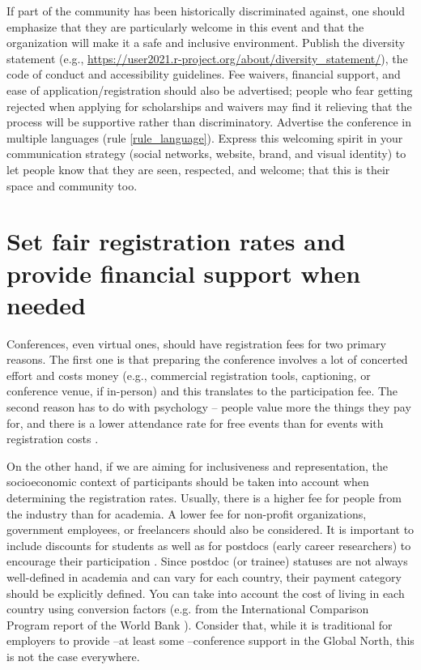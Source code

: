 \documentclass[10pt,letterpaper]{article}
\begin{document}
If part of the community has been historically discriminated against, one should emphasize that they are particularly welcome in this event and that the organization will make it a safe and inclusive environment. Publish the diversity statement (e.g., \url{https://user2021.r-project.org/about/diversity_statement/}), the code of conduct and accessibility guidelines. Fee waivers, financial support, and ease of application/registration should also be advertised; people who fear getting rejected when applying for scholarships and waivers may find it relieving that the process will be supportive rather than discriminatory. Advertise the conference in multiple languages (rule \ref{rule_language}). Express this welcoming spirit in your communication strategy (social networks, website, brand, and visual identity) to let people know that they are seen, respected, and welcome; that this is their space and community too. 

\section{Set fair registration rates and provide financial support when needed}
\label{rule_costs}


Conferences, even virtual ones, should have registration fees for two primary reasons. The first one is that preparing the conference involves a lot of concerted effort and costs money (e.g., commercial registration tools, captioning, or conference venue, if in-person) and this translates to the participation fee. The second reason has to do with psychology -- people value more the things they pay for, and there is a lower attendance rate for free events than for events with registration costs \cite{eventbrite_ultimate_2017}. 

On the other hand, if we are aiming for inclusiveness and representation, the socioeconomic context of participants should be taken into account when determining the registration rates. Usually, there is a higher fee for people from the industry than for academia. A lower fee for non-profit organizations, government employees, or freelancers should also be considered. It is important to include discounts for students as well as for postdocs (early career researchers) to encourage their participation \cite{sarabipourChangingScientificMeetings2021, andalibPostdocQueueLabour2018, kaplanPostdocNot2012}. Since postdoc (or trainee) statuses are not always well-defined in academia and can vary for each country, their payment category should be explicitly defined. You can take into account the cost of living in each country using conversion factors (e.g. from the International Comparison Program report of the World Bank \cite{arendDisparityConferenceRegistration2019}). Consider that, while it is traditional for employers to provide --at least some --conference support in the Global North, this is not the case everywhere. 
\end{document}
